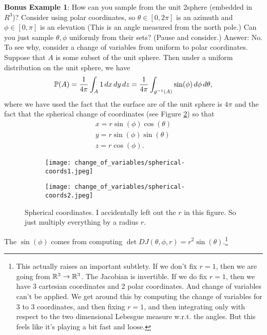 \vspace{1em}
\noindent
\textbf{Bonus Example 1}: How can you sample from the unit 2sphere (embedded in $R^3$)? Consider using polar coordinates, so $\theta\in [0, 2\pi]$ is an azimuth and $\phi\in [0, \pi]$ is an elevation (This is an angle measured from the north pole.) Can you just sample $\theta, \phi$ uniformly from their sets? (Pause and consider.) Answer: No. To see why, consider a change of variables from uniform to polar coordinates. Suppose that $A$ is some subset of the unit sphere. Then under a uniform distribution on the unit sphere, we have
$$
\mathbb{P}(A) = \frac{1}{4\pi}\int_{A} 1\, dx\, dy\, dz = \frac{1}{4\pi}\int_{g^{-1}(A)} \sin(\phi) \,d\phi \,d\theta,
$$
where we have used the fact that the surface are of the unit sphere is $4\pi$ and the fact that the spherical change of coordinates (see Figure \ref{fig:spherical-coords}) so that
\begin{align}
x = r\sin(\phi)\cos(\theta) \\
y = r\sin(\phi)\sin(\theta) \\
z = r\cos(\phi). 
\end{align}
\begin{figure}[h]

     \centering
     \begin{subfigure}[b]{0.4\textwidth}
         \centering
         \texttt{[image: change\_of\_variables/spherical-coords1.jpeg]}
         \caption{}
     \end{subfigure}
     \begin{subfigure}[b]{0.4\textwidth}
         \centering
         \texttt{[image: change\_of\_variables/spherical-coords2.jpeg]}
         \caption{}
         \label{fig:three sin x}
     \end{subfigure}
        \caption{Spherical coordinates. I accidentally left out the $r$ in this figure. So just multiply everything by a radius $r$.}
        \label{fig:spherical-coords}
\end{figure}
The $\sin(\phi)$ comes from computing $\det DJ(\theta, \phi, r) = r^2\sin(\theta)$.\footnote{This actually raises an important subtlety. If we don't fix $r=1$, then we are going from $\mathbb{R}^3\to \mathbb{R}^3$. The Jacobian is invertible. If we do fix $r=1$, then we have 3 cartesian coordinates and 2 polar coordinates. And change of variables can't be applied. We get around this by computing the change of variables for 3 to 3 coordinates, and then fixing $r=1$, and then integrating only with respect to the two dimensional Lebesgue measure w.r.t. the angles. But this feels like it's playing a bit fast and loose.}
